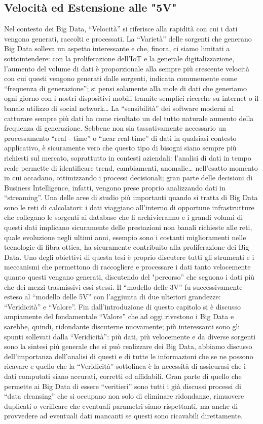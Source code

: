 \documentclass[a4paper,12pt]{report}
\begin{document}
\subsection{Velocità ed Estensione alle "5V"}
 Nel contesto dei Big Data, “Velocità” si riferisce alla rapidità con cui i dati vengono generati, raccolti e processati. La “Varietà” delle sorgenti che generano Big Data solleva un aspetto interessante e che, finora, ci siamo limitati a sottointendere: con la proliferazione dell’IoT e la generale digitalizzazione, l’aumento del volume di dati è proporzionale alla sempre più crescente velocità con cui questi vengono generati dalle sorgenti, indicata comunemente come “frequenza di generazione”; si pensi solamente alla mole di dati che generiamo ogni giorno con i nostri dispositivi mobili tramite semplici ricerche su internet o il banale utilizzo di social network… La “sensibilità” dei software moderni al catturare sempre più dati ha come risultato un del tutto naturale aumento della frequenza di generazione. Sebbene non sia tassativamente necessario un processamento “real - time” o “near real-time” di dati in qualsiasi contesto applicativo, è sicuramente vero che questo tipo di bisogni siano sempre più richiesti sul mercato, soprattutto in contesti aziendali: l’analisi di dati in tempo reale permette di identificare trend, cambiamenti, anomalie… nell’esatto momento in cui accadano, ottimizzando i processi decisionali; gran parte delle decisioni di Business Intelligence, infatti, vengono prese proprio analizzando dati in “streaming”. Una delle aree di studio più importanti quando si tratta di Big Data sono le reti di calcolatori: i dati viaggiano all’interno di opportune infrastrutture che collegano le sorgenti ai database che li archivieranno e i grandi volumi di questi dati implicano sicuramente delle prestazioni non banali richieste alle reti, quale evoluzione negli ultimi anni, esempio sono i costanti miglioramenti nelle tecnologie di fibra ottica, ha sicuramente contribuito alla proliferazione dei Big Data. Uno degli obiettivi di questa tesi è proprio discutere tutti gli strumenti e i meccanismi che permettono di raccogliere e processare i dati tanto velocemente quanto questi vengano generati, discutendo del "percorso” che seguono i dati più che dei mezzi trasmissivi essi stessi.
 Il “modello delle 3V” fu successivamente esteso al “modello delle 5V” con l’aggiunta di due ulteriori grandezze: “Veridicità” e “Valore”. Fin dall’introduzione di questo capitolo si è discusso ampiamente del fondamentale “Valore” che ad oggi rivestono i Big Data e sarebbe, quindi, ridondante discuterne nuovamente; più interessanti sono gli spunti sollevati dalla “Veridicità”: più dati, più velocemente e da diverse sorgenti sono la sintesi più generale che si può realizzare dei Big Data, abbiamo discusso dell’importanza dell’analisi di questi e di tutte le informazioni che se ne possono ricavare e quello che la “Veridicità” sottolinea è la necessità di assicurasi che i dati computati siano accurati, corretti ed affidabili. Gran parte di quello che permette ai Big Data di essere “veritieri” sono tutti i già discussi processi di “data cleansing” che si occupano non solo di eliminare ridondanze, rimuovere duplicati o verificare che eventuali parametri siano rispettanti, ma anche di provvedere ad eventuali dati mancanti se questi sono ricavabili direttamente.
\end{document}
